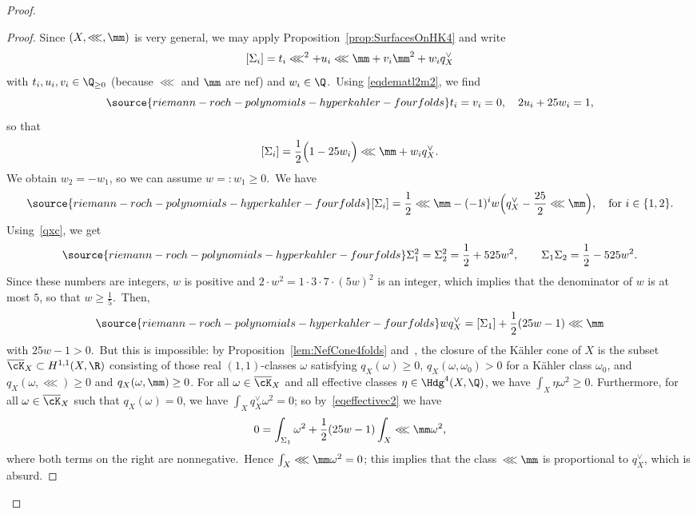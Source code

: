\begin{proof}
\begin{proof}
Since $(X,\lll,\mm)$ is very general, we may apply Proposition~\ref{prop:SurfacesOnHK4} and write
\[
[\Sigma_i]=t_{i} \lll^2+u_{i}\lll\mm+v_{i} \mm^2+w_{i} q_X^\vee
\]
with $t_{i}, u_i,v_i\in \Q_{\ge0} $ (because $\lll$ and $\mm$ are nef) and $w_i\in \Q $.\
Using \eqref{eqdematl2m2}, we find
\begin{equation*}\label{eqpoureta3eta4}
\source{riemann-roch-polynomials-hyperkahler-fourfolds}
t_{i}=v_i=0,\quad 2u_{i}+25w_{i}=1,
\end{equation*}
so that
\[
[\Sigma_i]=\frac{1}{2}\Bigl(1-25w_{i}\Bigr) \lll\mm+w_{i} q_X^\vee.
\]
We obtain $w_2=- w_1$, so we can assume $w=:w_1\geq 0$.\
We have
\begin{equation*}\label{eqSigmai}
\source{riemann-roch-polynomials-hyperkahler-fourfolds}
[\Sigma_i]=\frac{1}{2}\lll\mm-(-1)^i w\Bigl(q_X^\vee-\frac{25}2\lll\mm\Bigr),\quad \textnormal{for }i\in\{1,2\}.
\end{equation*}
Using~\eqref{qxc}, we get
\begin{equation*}\label{eqnumbres}
\source{riemann-roch-polynomials-hyperkahler-fourfolds}
\Sigma_1^2= \Sigma_2^2=\frac{1}{2}+525w^2,\qquad \Sigma_1\Sigma_2=\frac{1}{2}-525w^2.
\end{equation*}
Since these numbers are integers, $w$ is positive and $2\cdot w^2=1\cdot 3\cdot 7\cdot (5w)^2$ is an integer, which implies that the denominator of $w$ is at most $5$, so that $w\geq \frac{1}{5}$.\
Then,
\begin{equation}\label{eqeffectivec2}
\source{riemann-roch-polynomials-hyperkahler-fourfolds}
w q_X^\vee=[\Sigma_1]+\frac{1}{2}(25w -1)\lll\mm
\end{equation}
with $25w -1>0$.\ But this is impossible: by Proposition~\ref{lem:NefCone4folds} and~\cite[Proposition 3.2]{huyKahler}, the closure of the K\"ahler cone of $X$ is the subset $\overline{\cK}_X\subset H^{1,1}(X,\R)$ consisting of those real $(1,1)$-classes $\omega$ satisfying $q_X(\omega)\geq 0$, $q_X(\omega,\omega_0)>0$ for a K\"ahler class $\omega_0$, and $q_X(\omega,\lll)\ge0$ and $ q_X(\omega,\mm)\geq0$.
For all $\omega\in \overline{\cK}_X$ and all effective classes $\eta\in{\Hdg}^4(X,\Q)$, we have $\int_X\eta\omega^2\geq 0$.
Furthermore, for all $\omega\in \overline{\cK}_X$ such that $q_X(\omega)=0$, we have $\int_X q_X^\vee \omega^2=0$; so by~\eqref{eqeffectivec2} we have
\[
0=\int_{\Sigma_1}\omega^2+\frac{1}{2}(25w -1)\int_X\lll\mm\omega^2,
\]
where both terms on the right are nonnegative.\
Hence $\int_X\lll\mm\omega^2=0$; this implies that the class~$\lll\mm$ is proportional to $q_X^\vee$, which is absurd.


\end{proof}
\end{proof}
